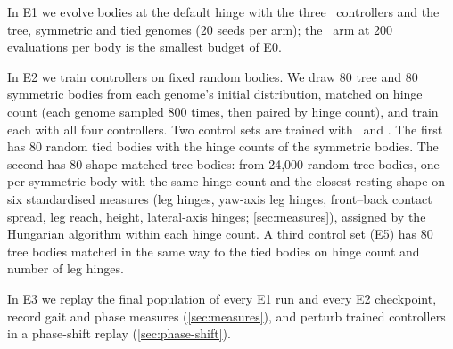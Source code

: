 In E1 we evolve bodies at the default hinge with the three \bb\ controllers and the tree, symmetric and tied genomes (20 seeds per arm); the \dann\ arm at 200 evaluations per body is the smallest budget of E0.

In E2 we train controllers on fixed random bodies. We draw 80 tree and 80 symmetric bodies from each genome's initial distribution, matched on hinge count (each genome sampled 800 times, then paired by hinge count), and train each with all four controllers. Two control sets are trained with \bb\ and \dann. The first has 80 random tied bodies with the hinge counts of the symmetric bodies. The second has 80 shape-matched tree bodies: from 24{,}000 random tree bodies, one per symmetric body with the same hinge count and the closest resting shape on six standardised measures (leg hinges, yaw-axis leg hinges, front--back contact spread, leg reach, height, lateral-axis hinges; \cref{sec:measures}), assigned by the Hungarian algorithm within each hinge count. A third control set (E5) has 80 tree bodies matched in the same way to the tied bodies on hinge count and number of leg hinges.

In E3 we replay the final population of every E1 run and every E2 checkpoint, record gait and phase measures (\cref{sec:measures}), and perturb trained controllers in a phase-shift replay (\cref{sec:phase-shift}).

\begin{table}[t]
  \centering
  \small
  \caption{Experiments. Evaluations are controller evaluations per body (inner CMA-ES). Compute in CPU hours, estimated from the first round of runs.}
  \label{tab:experiments}
\end{table}

